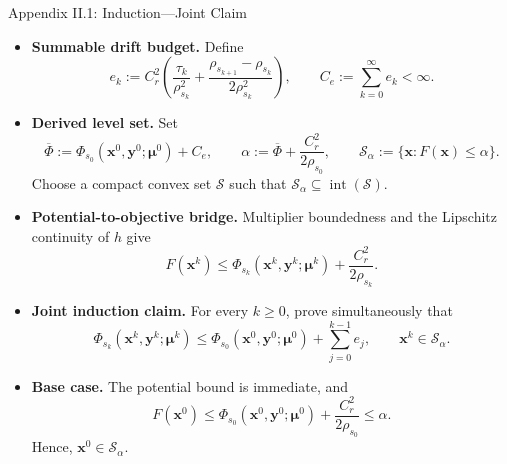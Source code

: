 \documentclass[handout,compress,9pt]{beamer}
\newcommand{\blue}[1]{\textcolor{ddlblue}{#1}}
\newcommand{\bx}{\bm{x}}
\newcommand{\by}{\bm{y}}
\newcommand{\bmu}{\bm{\mu}}
\newcommand{\calS}{\mathcal{S}}
\begin{document}


\begin{frame}{Appendix II.1: Induction---Joint Claim
\hfill\hyperlink{appendix:contents}{}}
\hypertarget{appendix:bootstrap-joint-claim}{}
\scriptsize
\begin{itemize}
\setlength{\itemsep}{0.11cm}

\item[\blue{$\triangleright$}]
\textbf{Summable drift budget.}
Define
\begin{equation*}
  e_k:=C_r^2\left(
  \frac{\tau_k}{\rho_{s_k}^2}
  +\frac{\rho_{s_{k+1}}-\rho_{s_k}}{2\rho_{s_k}^2}
  \right),
  \qquad
  C_e:=\sum_{k=0}^{\infty}e_k<\infty.
\end{equation*}

\item[\blue{$\triangleright$}]
\textbf{Derived level set.}
Set
\begin{equation*}
  \overline\Phi:=\Phi_{s_0}(\bx^0,\by^0;\bmu^0)+C_e,
  \qquad
  \alpha:=\overline\Phi+\frac{C_r^2}{2\rho_{s_0}},
  \qquad
  \calS_\alpha:=\{\bx:F(\bx)\leq\alpha\}.
\end{equation*}
Choose a compact convex set $\calS$ such that
$\calS_\alpha\subseteq\operatorname{int}(\calS)$.

\item[\blue{$\triangleright$}]
\textbf{Potential-to-objective bridge.}
Multiplier boundedness and the Lipschitz continuity of $h$ give
\begin{equation*}
  F(\bx^k)
  \leq
  \Phi_{s_k}(\bx^k,\by^k;\bmu^k)
  +\frac{C_r^2}{2\rho_{s_k}}.
\end{equation*}

\item[\blue{$\triangleright$}]
\textbf{Joint induction claim.}
For every $k\geq0$, prove simultaneously that
\begin{equation*}
  \Phi_{s_k}(\bx^k,\by^k;\bmu^k)
  \leq
  \Phi_{s_0}(\bx^0,\by^0;\bmu^0)+\sum_{j=0}^{k-1}e_j,
  \qquad
  \bx^k\in\calS_\alpha.
\end{equation*}

\item[\blue{$\triangleright$}]
\textbf{Base case.}
The potential bound is immediate, and
\begin{equation*}
  F(\bx^0)
  \leq\Phi_{s_0}(\bx^0,\by^0;\bmu^0)
  +\frac{C_r^2}{2\rho_{s_0}}
  \leq\alpha.
\end{equation*}
Hence, $\bx^0\in\calS_\alpha$.
\end{itemize}
\end{frame}
\end{document}
